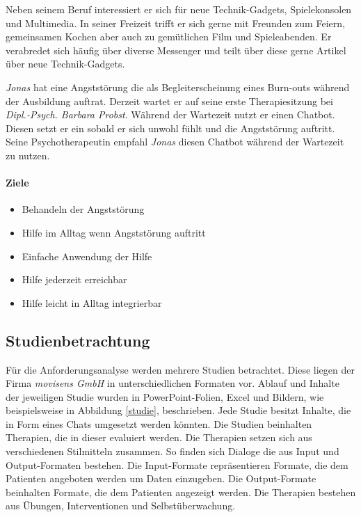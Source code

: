 Neben seinem Beruf interessiert er sich für neue Technik-Gadgets, Spielekonsolen und Multimedia. In seiner Freizeit trifft er sich gerne mit Freunden zum Feiern, gemeinsamen Kochen aber auch zu gemütlichen Film und Spieleabenden. Er verabredet sich häufig über diverse Messenger und teilt über diese gerne Artikel über neue Technik-Gadgets.

\emph{Jonas} hat eine Angststörung die als Begleiterscheinung eines Burn-outs während der Ausbildung auftrat.  Derzeit wartet er auf seine erste Therapiesitzung bei \emph{Dipl.-Psych. Barbara Probst}. Während der Wartezeit nutzt er einen Chatbot. Diesen setzt er ein sobald er sich unwohl fühlt und die Angststörung auftritt. Seine Psychotherapeutin empfahl \emph{Jonas} diesen Chatbot während der Wartezeit zu nutzen.

\paragraph{Ziele}
\begin{itemize}
\item Behandeln der Angststörung
\item Hilfe im Alltag wenn Angststörung auftritt
\item Einfache Anwendung der Hilfe
\item Hilfe jederzeit erreichbar
\item Hilfe leicht in Alltag integrierbar
\end{itemize}


\subsection{Studienbetrachtung}
Für die Anforderungsanalyse werden mehrere Studien betrachtet. Diese liegen der Firma \emph{movisens GmbH} in unterschiedlichen Formaten vor. Ablauf und Inhalte der jeweiligen Studie wurden in PowerPoint-Folien, Excel und Bildern, wie beispielsweise in Abbildung \ref{studie}, beschrieben. Jede Studie besitzt Inhalte, die in Form eines Chats umgesetzt werden könnten. Die Studien beinhalten Therapien, die in dieser evaluiert werden. Die Therapien setzen sich aus verschiedenen Stilmitteln zusammen. So finden sich Dialoge die aus Input und Output-Formaten bestehen. Die Input-Formate repräsentieren Formate, die dem Patienten angeboten werden um Daten einzugeben. Die Output-Formate beinhalten Formate, die dem Patienten angezeigt werden. Die Therapien bestehen aus Übungen, Interventionen und Selbstüberwachung.

